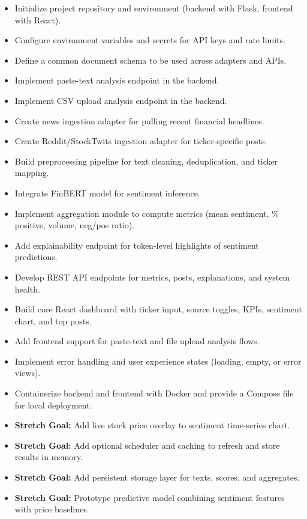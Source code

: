 \documentclass[12pt]{article}
\begin{document}
\begin{itemize}
    \item Initialize project repository and environment (backend with Flask, frontend with React).
    \item Configure environment variables and secrets for API keys and rate limits.
    \item Define a common document schema to be used across adapters and APIs.
    \item Implement paste-text analysis endpoint in the backend.
    \item Implement CSV upload analysis endpoint in the backend.
    \item Create news ingestion adapter for pulling recent financial headlines.
    \item Create Reddit/StockTwits ingestion adapter for ticker-specific posts.
    \item Build preprocessing pipeline for text cleaning, deduplication, and ticker mapping.
    \item Integrate FinBERT model for sentiment inference.
    \item Implement aggregation module to compute metrics (mean sentiment, \% positive, volume, neg/pos ratio).
    \item Add explainability endpoint for token-level highlights of sentiment predictions.
    \item Develop REST API endpoints for metrics, posts, explanations, and system health.
    \item Build core React dashboard with ticker input, source toggles, KPIs, sentiment chart, and top posts.
    \item Add frontend support for paste-text and file upload analysis flows.
    \item Implement error handling and user experience states (loading, empty, or error views).
    \item Containerize backend and frontend with Docker and provide a Compose file for local deployment.
    \item \textbf{Stretch Goal:} Add live stock price overlay to sentiment time-series chart.
    \item \textbf{Stretch Goal:} Add optional scheduler and caching to refresh and store results in memory.
    \item \textbf{Stretch Goal:} Add persistent storage layer for texts, scores, and aggregates.
    \item \textbf{Stretch Goal:} Prototype predictive model combining sentiment features with price baselines.
\end{itemize}




\end{document}
